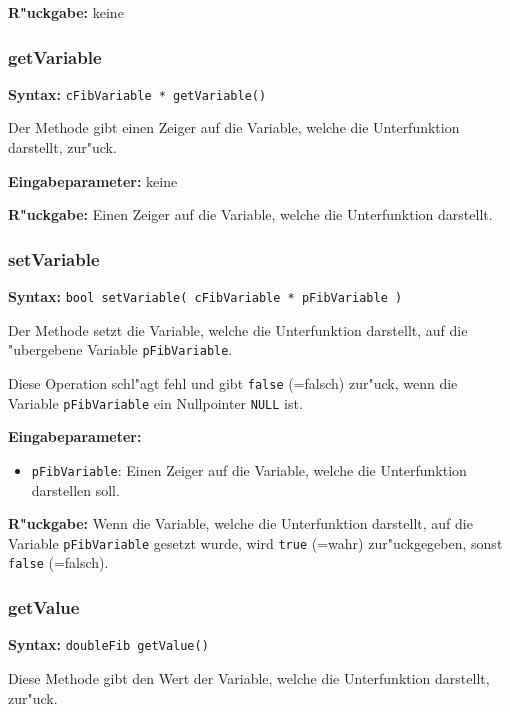 \bigskip\noindent
\textbf{R"uckgabe:} keine


\subsubsection{getVariable}

\textbf{Syntax:} \verb|cFibVariable * getVariable()|

\bigskip\noindent
Der Methode gibt einen Zeiger auf die Variable, welche die Unterfunktion darstellt, zur"uck.

\bigskip\noindent
\textbf{Eingabeparameter:} keine

\bigskip\noindent
\textbf{R"uckgabe:}  Einen Zeiger auf die Variable, welche die Unterfunktion darstellt.


\subsubsection{setVariable}

\textbf{Syntax:} \verb|bool setVariable( cFibVariable * pFibVariable )|

\bigskip\noindent
Der Methode setzt die Variable, welche die Unterfunktion darstellt, auf die "ubergebene Variable \verb|pFibVariable|.

Diese Operation schl"agt fehl und gibt \verb|false| (=falsch) zur"uck, wenn die Variable \verb|pFibVariable| ein Nullpointer \verb|NULL| ist.

\bigskip\noindent
\textbf{Eingabeparameter:}
\begin{itemize}
 \item \verb|pFibVariable|: Einen Zeiger auf die Variable, welche die Unterfunktion darstellen soll.
\end{itemize}

\bigskip\noindent
\textbf{R"uckgabe:} Wenn die Variable, welche die Unterfunktion darstellt, auf die Variable \verb|pFibVariable| gesetzt wurde, wird \verb|true| (=wahr) zur"uckgegeben, sonst \verb|false| (=falsch).


\subsubsection{getValue}

\textbf{Syntax:} \verb|doubleFib getValue()|

\bigskip\noindent
Diese Methode gibt den Wert der Variable, welche die Unterfunktion darstellt, zur"uck.

